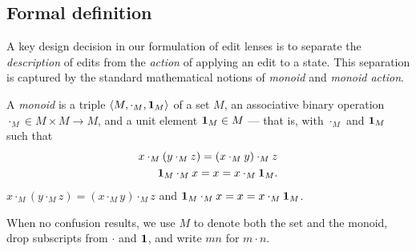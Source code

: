 
\subsection{Formal definition}
\label{sec:semantics}

A key design decision in our formulation of edit lenses is to separate the
{\em description} of edits from the {\em action} of applying an edit to a
state.  This separation is captured by the standard mathematical notions of
{\em monoid} and {\em monoid action}.

\begin{definition}
A \emph{monoid} is a triple $\left<M,\cdot_M,\mbox{\bf{1}}_M\right>$ of a set
$M$, an associative binary operation $\cdot_M \in M \times M
\to M$, and a unit element $\mbox{\bf{1}}_M \in M$ --- that is, with $\cdot_M$ and $\mbox{\bf{1}}_M$ such that
\iffull
\begin{eqnarray*}
x\cdot_M(y\cdot_M z) = (x\cdot_M y) \cdot_M z\\
\mbox{\bf{1}}_M\cdot_M x = x = x \cdot_M \mbox{\bf{1}}_M .
\end{eqnarray*}
\else
$x\cdot_M(y\cdot_M z) = (x\cdot_M y) \cdot_M z $ and
$\mbox{\bf{1}}_M\cdot_M x = x = x \cdot_M \mbox{\bf{1}}_M$.
\fi
\end{definition}
When no confusion results, we use $M$ to denote both the set and the
monoid, drop subscripts from $\cdot$ and $\mbox{\bf{1}}$, and write $mn$ for
$m \cdot n$.

